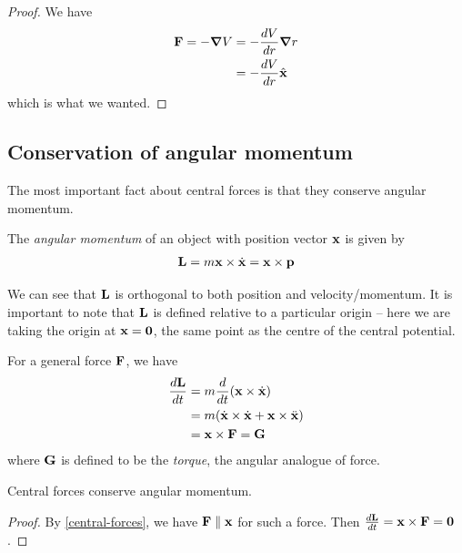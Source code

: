 \documentclass{../template/note}
\begin{document}
    \begin{proof}
        We have
        \begin{align*}
            \V F = -\grad V &= -\frac{dV}{dr}\grad r \\
            &= -\frac{dV}{dr} \hvec x
        \end{align*}
        which is what we wanted.
    \end{proof}
    
    \subsection{Conservation of angular momentum}

    The most important fact about central forces is that they conserve angular momentum.

    \begin{definition}
        The \emph{angular momentum} of an object with position vector \(\V x\) is given by
        \begin{align*}
            \V L = m \V x \times \dot{\V x} = \V x \times \V p
        \end{align*}
    \end{definition}
    We can see that \(\V L\) is orthogonal to both position and velocity/momentum. It is important to note that \(\V L\) is defined relative to a particular origin -- here we are taking the origin at \(\V x = \V 0\), the same point as the centre of the central potential.

    For a general force \(\V F\), we have
    \begin{align*}
        \frac{d\V L}{dt} &= m \frac{d}{dt}(\V x \times \dot{\V x}) \\
        &= m(\dot{\V x} \times \dot{\V x} + \V x \times \ddot{\V x}) \\
        &= \V x \times \V F = \V G
    \end{align*}
    where \(\V G\) is defined to be the \emph{torque}, the angular analogue of force.
    
    \begin{proposition}
        Central forces conserve angular momentum.
    \end{proposition}
    
    \begin{proof}
        By \cref{central-forces}, we have \(\V F \parallel \V x\) for such a force. Then \(\frac{d\V L}{dt} = \V x \times \V F = \V 0\).
    \end{proof}
    
\end{document}
